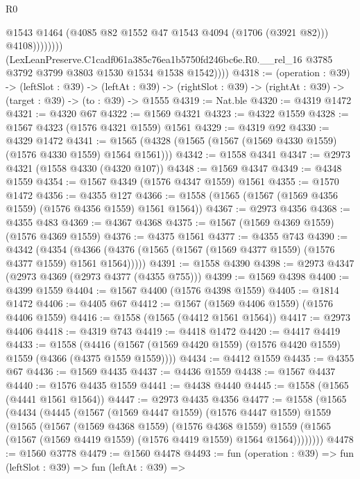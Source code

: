 \begin{lexlean}{R0}
\begin{coremodule}
                          @1543
                          @1464
                          (@4085 @82 @1552 @47 @1543 @4094 (@1706 (@3921 @82)))
                          @4108))))))))
          (LexLeanPreserve.C1cadf061a385c76ea1b5750fd246bc6e.R0.__rel_16
            @3785
            @3792
            @3799
            @3803
            @1530
            @1534
            @1538
            @1542))))
@4318 := (operation : @39) ->
  (leftSlot : @39) ->
  (leftAt : @39) -> (rightSlot : @39) -> (rightAt : @39) -> (target : @39) -> (to : @39) -> @1555
@4319 := Nat.ble
@4320 := @4319 @1472
@4321 := @4320 @67
@4322 := @1569 @4321
@4323 := @4322 @1559
@4328 := @1567 @4323 (@1576 @4321 @1559) @1561
@4329 := @4319 @92
@4330 := @4329 @1472
@4341 := @1565 (@4328 (@1565 (@1567 (@1569 @4330 @1559) (@1576 @4330 @1559) @1564 @1561)))
@4342 := @1558 @4341
@4347 := @2973 @4321 (@1558 @4330 (@4320 @107))
@4348 := @1569 @4347
@4349 := @4348 @1559
@4354 := @1567 @4349 (@1576 @4347 @1559) @1561
@4355 := @1570 @1472
@4356 := @4355 @127
@4366 := @1558 (@1565 (@1567 (@1569 @4356 @1559) (@1576 @4356 @1559) @1561 @1564))
@4367 := @2973 @4356
@4368 := @4355 @483
@4369 := @4367 @4368
@4375 := @1567 (@1569 @4369 @1559) (@1576 @4369 @1559)
@4376 := @4375 @1561
@4377 := @4355 @743
@4390 := @4342
    (@4354 (@4366 (@4376 (@1565 (@1567 (@1569 @4377 @1559) (@1576 @4377 @1559) @1561 @1564)))))
@4391 := @1558 @4390
@4398 := @2973 @4347 (@2973 @4369 (@2973 @4377 (@4355 @755)))
@4399 := @1569 @4398
@4400 := @4399 @1559
@4404 := @1567 @4400 (@1576 @4398 @1559)
@4405 := @1814 @1472
@4406 := @4405 @67
@4412 := @1567 (@1569 @4406 @1559) (@1576 @4406 @1559)
@4416 := @1558 (@1565 (@4412 @1561 @1564))
@4417 := @2973 @4406
@4418 := @4319 @743
@4419 := @4418 @1472
@4420 := @4417 @4419
@4433 := @1558
    (@4416 (@1567 (@1569 @4420 @1559) (@1576 @4420 @1559) @1559 (@4366 (@4375 @1559 @1559))))
@4434 := @4412 @1559
@4435 := @4355 @67
@4436 := @1569 @4435
@4437 := @4436 @1559
@4438 := @1567 @4437
@4440 := @1576 @4435 @1559
@4441 := @4438 @4440
@4445 := @1558 (@1565 (@4441 @1561 @1564))
@4447 := @2973 @4435 @4356
@4477 := @1558
    (@1565
      (@4434
        (@4445
          (@1567
            (@1569 @4447 @1559)
            (@1576 @4447 @1559)
            @1559
            (@1565
              (@1567
                (@1569 @4368 @1559)
                (@1576 @4368 @1559)
                @1559
                (@1565 (@1567 (@1569 @4419 @1559) (@1576 @4419 @1559) @1564 @1564))))))))
@4478 := @1560 @3778
@4479 := @1560 @4478
@4493 := fun (operation : @39) =>
  fun (leftSlot : @39) =>
  fun (leftAt : @39) =>

\end{coremodule}
\end{lexlean}
